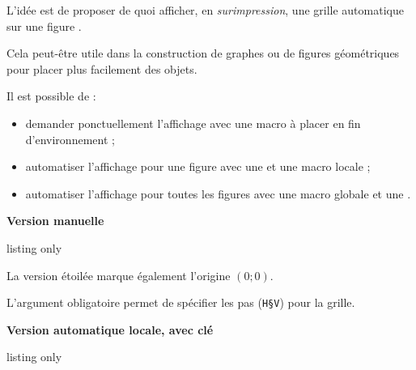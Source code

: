 \documentclass[french,11pt,a4paper]{article}
\begin{document}
L'idée est de proposer de quoi afficher, en \textit{surimpression}, une grille automatique sur une figure .

Cela peut-être utile dans la construction de graphes ou de figures géométriques pour placer plus facilement des objets.

\smallskip

Il est possible de :

\begin{itemize}
	\item demander ponctuellement l'affichage avec une macro à placer en fin d'environnement ;
	\item automatiser l'affichage pour une figure avec une  et une macro locale ;
	\item automatiser l'affichage pour toutes les figures avec une macro globale et une .
\end{itemize}

\textbf{\large Version manuelle}

\begin{DemoCode}{listing only}
\end{DemoCode}

La version étoilée marque également l'origine $(0;0)$.

L'argument obligatoire permet de spécifier les pas (\texttt{H§V}) pour la grille.

\begin{DemoCode}{}
\end{DemoCode}

\textbf{\large Version automatique locale, avec clé}

\begin{DemoCode}{listing only}
\begin{tikzpicture}[grilleauto=pasX§pasY]
	\tkzAutoGridLocal(*)
\end{tikzpicture}
\end{DemoCode}
\end{document}
